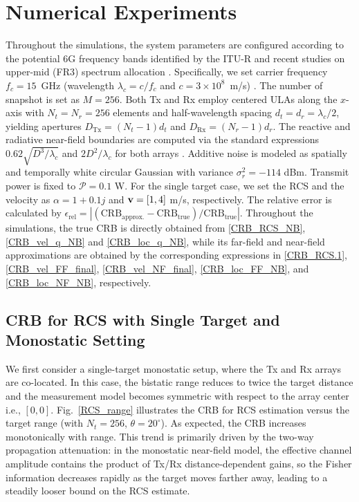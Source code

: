 \documentclass[9pt,final,journal,twocolumn]{IEEEtran}
\begin{document}
\section{Numerical Experiments}
Throughout the simulations, the system parameters are configured according to the potential 6G frequency bands identified by the ITU-R and recent studies on upper-mid (FR3) spectrum allocation \cite{testolina2024sharing,emil2025enabling}.
Specifically, we set carrier frequency $f_c=15$~GHz (wavelength $\lambda_c=c/f_c$ and $c=3\times10^8$~m/s) . The number of snapshot is set as 
$M=256$. Both Tx and Rx employ centered ULAs along the $x$-axis with $N_t=N_r=256$ elements and half-wavelength spacing $d_t=d_r=\lambda_c/2$, yielding apertures $D_{\mathrm{Tx}}=(N_t-1)d_t$ and $D_{\mathrm{Rx}}=(N_r-1)d_r$. The reactive and radiative near-field boundaries are computed via the standard expressions $0.62\sqrt{D^3/\lambda_c}$ and $2D^2/\lambda_c$ for both arrays \cite{elbir2023near-field,elbir2024spherical,elbir2023nba,elbir2024near,hu2024joint}.
Additive noise is modeled as spatially and temporally white circular Gaussian with variance ${\sigma}_r^2 = -114$ dBm. Transmit power is fixed to $\mathcal{P}=0.1$ W. For the single target case, we set the RCS and the velocity as ${\alpha}=1+0.1j$ and  ${\bf v}=[1,4]$ m/s, respectively. The relative error is calculated by $\epsilon_{\mathrm{rel}} =\left|\left(\mathrm{CRB}_{\mathrm{approx.}}-\mathrm{CRB}_{\mathrm{true}}\right)/\mathrm{CRB}_{\mathrm{true}}\right|$. Throughout the simulations, the true CRB is directly obtained from \eqref{CRB_RCS_NB}, \eqref{CRB_vel_q_NB} and \eqref{CRB_loc_q_NB}, while its far-field and near-field approximations are obtained by the corresponding expressions in \eqref{CRB_RCS.1}, \eqref{CRB_vel_FF_final}, \eqref{CRB_vel_NF_final}, \eqref{CRB_loc_FF_NB}, and \eqref{CRB_loc_NF_NB}, respectively.
%
\vspace{-0.2cm}
\subsection{CRB for RCS with Single Target and Monostatic Setting}
We first consider a single-target monostatic setup, where the Tx and Rx arrays are co-located. In this case, the bistatic range reduces to twice the target distance and the measurement model becomes symmetric with respect to the array center i.e., $[0,0]$. 
Fig.~\ref{RCS_range} illustrates the CRB for RCS estimation versus the target range (with $N_t=256$, $\theta=20^{\circ}$). As expected, the CRB increases monotonically with range. This trend is primarily driven by the two-way propagation attenuation: in the monostatic near-field model, the effective channel amplitude contains the product of Tx/Rx distance-dependent gains, so the Fisher information decreases rapidly as the target moves farther away, leading to a steadily looser bound on the RCS estimate.
\end{document}
